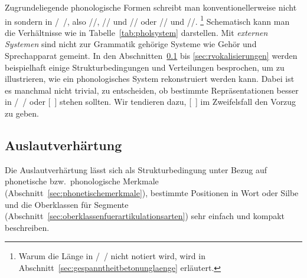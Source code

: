 \begin{table}[!htbp]
  \caption{Lexikon, Phonologie und Phonetik}
  \label{tab:pholsystem}
\end{table}

Zugrundeliegende phonologische Formen schreibt man konventionellerweise nicht in \textipa{[~]} sondern in /~/, also \zB //, // und // oder // und \mbox{//}.%
\footnote{Warum die Länge in /~/ nicht notiert wird, wird in Abschnitt~\ref{sec:gespanntheitbetonunglaenge} erläutert.}
Schematisch kann man die Verhältnisse wie in Tabelle~\ref{tab:pholsystem} darstellen.
Mit \textit{externen Systemen} sind nicht zur Grammatik gehörige Systeme wie Gehör und Sprechapparat gemeint.
In den Abschnitten~\ref{sec:auslautverhaertungphonologie} bis \ref{sec:rvokalisierungen} werden beispielhaft einige Strukturbedingungen und Verteilungen besprochen, um zu illustrieren, wie ein phonologisches System rekonstruiert werden kann.
Dabei ist es manchmal nicht trivial, zu entscheiden, ob bestimmte Repräsentationen besser in /~/ oder [~] stehen sollten.
Wir tendieren dazu, [~] im Zweifelsfall den Vorzug zu geben.

\subsection{Auslautverhärtung}

\label{sec:auslautverhaertungphonologie}

Die Auslautverhärtung lässt sich als Strukturbedingung unter Bezug auf phonetische bzw.\ phonologische Merkmale (Abschnitt~\ref{sec:phonetischemerkmale}), bestimmte Positionen in Wort oder Silbe und die Oberklassen für Segmente (Abschnitt~\ref{sec:oberklassenfuerartikulationsarten}) sehr einfach und kompakt beschreiben.


